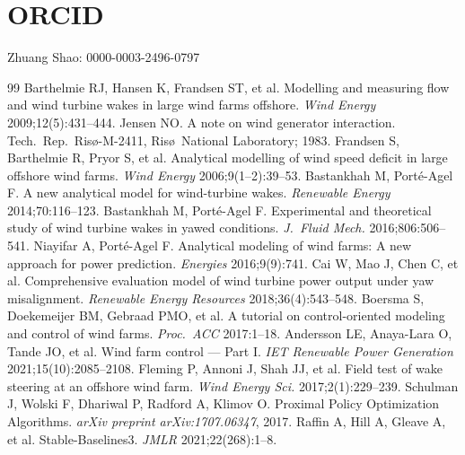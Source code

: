 \documentclass[final,5p,times]{elsarticle}
\begin{document}
\section*{ORCID}
Zhuang Shao: 0000-0003-2496-0797

\begin{thebibliography}{99}
\small
{} Barthelmie RJ, Hansen K, Frandsen ST, et al. Modelling and measuring flow and wind turbine wakes in large wind farms offshore. \emph{Wind Energy} 2009;12(5):431--444.
 Jensen NO. A note on wind generator interaction. Tech.\ Rep.\ Ris\o-M-2411, Ris\o\ National Laboratory; 1983.
 Frandsen S, Barthelmie R, Pryor S, et al. Analytical modelling of wind speed deficit in large offshore wind farms. \emph{Wind Energy} 2006;9(1--2):39--53.
 Bastankhah M, Port\'e-Agel F. A new analytical model for wind-turbine wakes. \emph{Renewable Energy} 2014;70:116--123.
 Bastankhah M, Port\'e-Agel F. Experimental and theoretical study of wind turbine wakes in yawed conditions. \emph{J.\ Fluid Mech.} 2016;806:506--541.
 Niayifar A, Port\'e-Agel F. Analytical modeling of wind farms: A new approach for power prediction. \emph{Energies} 2016;9(9):741.
 Cai W, Mao J, Chen C, et al. Comprehensive evaluation model of wind turbine power output under yaw misalignment. \emph{Renewable Energy Resources} 2018;36(4):543--548.
 Boersma S, Doekemeijer BM, Gebraad PMO, et al. A tutorial on control-oriented modeling and control of wind farms. \emph{Proc.\ ACC} 2017:1--18.
 Andersson LE, Anaya-Lara O, Tande JO, et al. Wind farm control --- Part I. \emph{IET Renewable Power Generation} 2021;15(10):2085--2108.
 Fleming P, Annoni J, Shah JJ, et al. Field test of wake steering at an offshore wind farm. \emph{Wind Energy Sci.} 2017;2(1):229--239.
 Schulman J, Wolski F, Dhariwal P, Radford A, Klimov O. Proximal Policy Optimization Algorithms. \emph{arXiv preprint arXiv:1707.06347}, 2017.
 Raffin A, Hill A, Gleave A, et al. Stable-Baselines3. \emph{JMLR} 2021;22(268):1--8.

\end{thebibliography}
\end{document}
